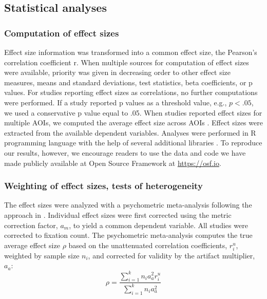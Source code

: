 \subsection{Statistical analyses}
\subsubsection{Computation of effect sizes}

Effect size information was transformed into a common effect size, the Pearson’s correlation coefficient r. When multiple sources for computation of effect sizes were available, priority was given in decreasing order to other effect size measures, means and standard deviations, test statistics, beta coefficients, or p values. For studies reporting effect sizes as correlations, no further computations were performed. If a study reported p values as a threshold value, e.g., $p < .05$, we used a conservative p value equal to .05. When studies reported effect sizes for multiple AOIs, we computed the average effect size across AOIs \citep[for a similar approach, see][]{chita2016attention}. Effect sizes were extracted from the available dependent variables. Analyses were performed in R programming language with the help of several additional libraries \citep{R2020,datatable,tidyverse,metafor,irr,lme4,lmerTest,xtable,extrafont}. To reproduce our results, however, we encourage readers to use the data and code we have made publicly available at Open Source Framework at \href{https://osf.io/buk7p/?view_only=73d36c26dd794f9689c954b13c63c474}{https://osf.io}. %


\subsubsection{Weighting of effect sizes, tests of heterogeneity}

The effect sizes were analyzed with a psychometric meta-analysis following the approach in \cite{hunter2004a}. Individual effect sizes were first corrected using the metric correction factor, $a_m$, to yield a common dependent variable. All studies were corrected to fixation count. The psychometric meta-analysis computes the true average effect size $\rho$ based on the unattenuated correlation coefficients, $r_i^u$, weighted by sample size $n_i$, and corrected for validity by the artifact multiplier, $a_a$: 
%
\begin{equation}
\label{eq:psychometric_rho}
\rho = \frac{\sum_{i=1}^k n_i a_a^2 r_i^u}{\sum_{i=1}^k n_i a_a^2}
\end{equation}

